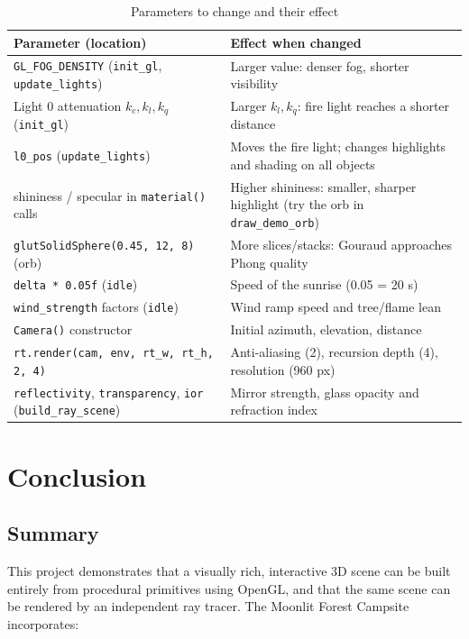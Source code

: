 \documentclass[12pt,a4paper]{report}
\newcommand{\tabfmt}{\footnotesize\singlespacing\renewcommand{\arraystretch}{1.1}}
\begin{document}
\begin{table}[!htbp]
\centering\tabfmt
\caption{Parameters to change and their effect}
\label{tab:params}
\begin{tabularx}{\textwidth}{|l|Y|}
\hline
\textbf{Parameter (location)} & \textbf{Effect when changed} \\
\hline
\texttt{GL\_FOG\_DENSITY} (\texttt{init\_gl}, \texttt{update\_lights}) & Larger value: denser fog, shorter visibility \\
\hline
Light 0 attenuation $k_c,k_l,k_q$ (\texttt{init\_gl}) & Larger $k_l,k_q$: fire light reaches a shorter distance \\
\hline
\texttt{l0\_pos} (\texttt{update\_lights}) & Moves the fire light; changes highlights and shading on all objects \\
\hline
shininess / specular in \texttt{material()} calls & Higher shininess: smaller, sharper highlight (try the orb in \texttt{draw\_demo\_orb}) \\
\hline
\texttt{glutSolidSphere(0.45, 12, 8)} (orb) & More slices/stacks: Gouraud approaches Phong quality \\
\hline
\texttt{delta * 0.05f} (\texttt{idle}) & Speed of the sunrise (0.05 = 20 s) \\
\hline
\texttt{wind\_strength} factors (\texttt{idle}) & Wind ramp speed and tree/flame lean \\
\hline
\texttt{Camera()} constructor & Initial azimuth, elevation, distance \\
\hline
\texttt{rt.render(cam, env, rt\_w, rt\_h, 2, 4)} & Anti-aliasing (2), recursion depth (4), resolution (960 px) \\
\hline
\texttt{reflectivity}, \texttt{transparency}, \texttt{ior} (\texttt{build\_ray\_scene}) & Mirror strength, glass opacity and refraction index \\
\hline
\end{tabularx}
\end{table}

\chapter{Conclusion}

\section{Summary}

This project demonstrates that a visually rich, interactive 3D scene can be built entirely from procedural primitives using OpenGL, and that the same scene can be rendered by an independent ray tracer.
The Moonlit Forest Campsite incorporates:
\end{document}
